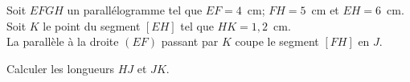 
Soit $EFGH$ un parallélogramme tel que $EF=4$~cm; $FH=5$~cm et
$EH=6$~cm. \\Soit $K$ le point du segment $[EH]$ tel que
$HK=1,2$~cm.\\La parallèle à la droite $(EF)$ passant par $K$ coupe le
segment $[FH]$ en $J$.\par Calculer les longueurs $HJ$ et $JK$.